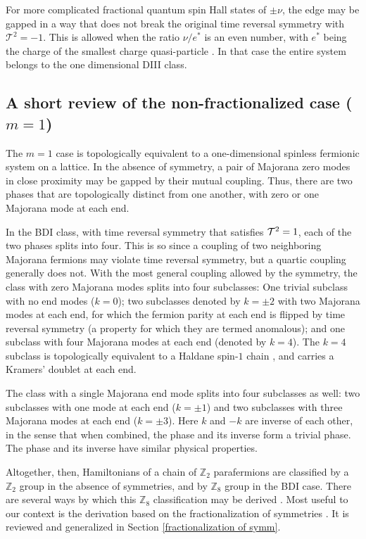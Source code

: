 \documentclass[twocolumn,aps,prb,showpacs]{revtex4-1}
\begin{document}
For more complicated fractional quantum spin Hall states of $\pm \nu$, the edge may be gapped in a way that does not break the original time reversal symmetry with $\mathcal{T}^2=-1$. This is allowed when the ratio $\nu/e^*$ is an even number, with $e^*$ being the charge of the smallest charge quasi-particle \cite{Levin2009}.
In that case
 the entire system belongs to the one dimensional DIII class.


\subsection{A short review of the non-fractionalized case ($m=1$)\label{review1dbd1}}
The $m=1$ case is topologically equivalent to a one-dimensional spinless fermionic system on a lattice. In the absence of symmetry, a pair of Majorana zero modes in close proximity may be gapped by their mutual coupling. Thus, there are two phases that are topologically distinct from one another, with zero or one Majorana mode at each end.

In the BDI class, with time reversal symmetry that satisfies ${\cal T}^2=1$, each of the two phases splits into four. This is so since a coupling of two neighboring Majorana fermions may violate time reversal symmetry, but a quartic coupling generally does not. With the most general coupling allowed by the symmetry, the class with zero Majorana modes splits into four subclasses: One trivial subclass with no end modes ($k=0$); two subclasses denoted by $k=\pm 2$ with two Majorana modes at each end, for which the fermion parity at each end is flipped by time reversal symmetry (a property for which they are termed anomalous);   and one subclass with four Majorana modes at each end (denoted by $k=4$). The $k=4$ subclass is topologically equivalent  \cite{Meidan2014} to a Haldane spin-$1$ chain \cite{Haldane1983a,Haldane1983b}, and carries a Kramers' doublet at each end.

The class with a single Majorana end mode splits into four subclasses as well: two subclasses with one mode at each end ($k=\pm 1$) and two subclasses with three Majorana modes at each end ($k=\pm 3$).
 Here $k $ and $ -k$ are inverse of each other,  in the sense that when combined, the phase and its inverse form a trivial phase. The phase and its inverse have similar physical properties.


 Altogether, then, Hamiltonians of a chain of $\mathbb{Z}_2$ parafermions are classified by a $\mathbb{Z}_2$ group in the absence of symmetries, and by $\mathbb{Z}_8$ group in the BDI case. There are several ways by which this $\mathbb{Z}_8$ classification may be derived \cite{Fidkowski2010,Turner2011,Fidkowski2011a,Meidan2014}. Most useful to our context is the derivation based on the fractionalization of symmetries \cite{Turner2011}. It is reviewed and generalized in Section \ref{fractionalization of symm}.
\end{document}
